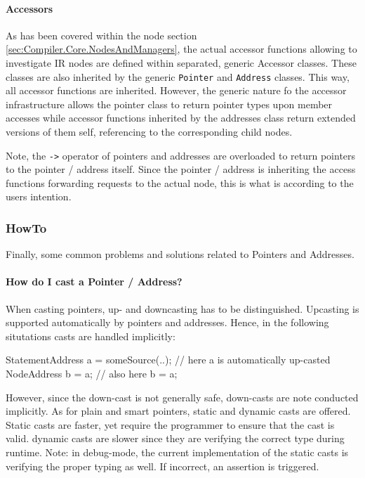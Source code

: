 \paragraph{Accessors}
As has been covered within the node section
\ref{sec:Compiler.Core.NodesAndManagers}, the actual accessor functions allowing
to investigate IR nodes are defined within separated, generic Accessor classes.
These classes are also inherited by the generic \texttt{Pointer} and
\texttt{Address} classes. This way, all accessor functions are inherited.
However, the generic nature fo the accessor infrastructure allows the pointer
class to return pointer types upon member accesses while accessor functions
inherited by the addresses class return extended versions of them self,
referencing to the corresponding child nodes.

Note, the \lstinline|->| operator of pointers and addresses are overloaded to
return pointers to the pointer / address itself. Since the pointer / address is
inheriting the access functions forwarding requests to the actual node, this is
what is according to the users intention.

\subsubsection{HowTo}
Finally, some common problems and solutions related to Pointers and Addresses.

\paragraph{How do I cast a Pointer / Address?}
When casting pointers, up- and downcasting has to be distinguished. Upcasting is
supported automatically by pointers and addresses. Hence, in the following
situtations casts are handled implicitly:
\begin{insCode}
	StatementAddress a = someSource(..);
	// here a is automatically up-casted
	NodeAddress b = a;
	// also here
	b = a;
\end{insCode}

However, since the down-cast is not generally safe, down-casts are note
conducted implicitly. As for plain and smart pointers, static and dynamic casts
are offered. Static casts are faster, yet require the programmer to ensure that
the cast is valid. dynamic casts are slower since they are verifying the correct
type during runtime. Note: in debug-mode, the current implementation of the
static casts is verifying the proper typing as well. If incorrect, an assertion
is triggered.

